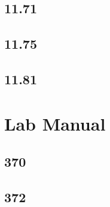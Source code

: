 \documentclass{article}
\begin{document}
\subsection{11.71}

\subsection{11.75}

\subsection{11.81}

\section{Lab Manual}

\subsection{370}

\subsection{372}
\end{document}
